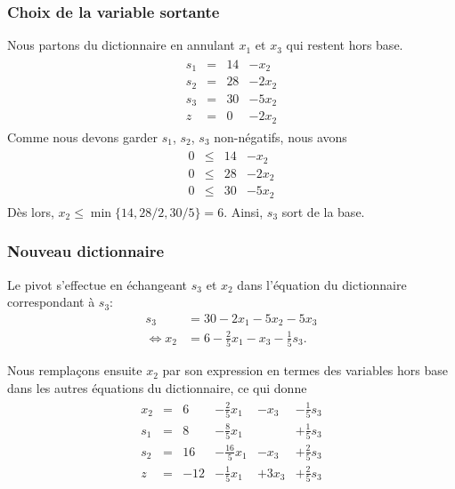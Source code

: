 \documentclass[usepdftitle=false]{beamer}
\begin{document}
\begin{frame}
\frametitle{Choix de la variable sortante}

Nous partons du dictionnaire en annulant $x_1$ et $x_3$ qui restent hors base.
\begin{align*}
\begin{array}{cccc}
s_1 & = & 14 & - x_2 \\
s_2 & =	& 28 & - 2x_2 \\
s_3 & =	& 30 & - 5x_2 \\
z & = & 0 & - 2 x_2
\end{array}
\end{align*}
Comme nous devons garder $s_1$, $s_2$, $s_3$ non-négatifs, nous avons
\begin{align*}
\begin{array}{cccc}
0 & \leq & 14 & - x_2 \\
0 & \leq & 28 & - 2x_2 \\
0 & \leq	& 30 & - 5x_2
\end{array}
\end{align*}
Dès lors, $x_2 \leq \min \{ 14, 28/2, 30/5 \} = 6$. Ainsi, $s_3$ sort de la base.

\end{frame}

\begin{frame}
\frametitle{Nouveau dictionnaire}

Le pivot s'effectue en échangeant $s_3$ et $x_2$ dans l'équation du dictionnaire correspondant à $s_3:$
\begin{align*}
s_3 & = 30 - 2x_1 - 5x_2 - 5x_3 \\
\Leftrightarrow x_2 & = 6 - \frac{2}{5}x_1 - x_3 - \frac{1}{5}s_3.
\end{align*}

Nous remplaçons ensuite $x_2$ par son expression en termes des variables hors base dans les autres équations du dictionnaire, ce qui donne
\begin{align*}
\begin{array}{cccccc}
x_2 & = & 6 & - \frac{2}{5}x_1 & - x_3 &- \frac{1}{5}s_3 \\
s_1 & = & 8 & - \frac{8}{5}x_1 &  & + \frac{1}{5}s_3 \\
s_2 & =	& 16 & - \frac{16}{5}x_1 & - x_3 & + \frac{2}{5}s_3 \\
z & = & -12 & - \frac{1}{5}x_1 & + 3 x_3 & + \frac{2}{5}s_3
\end{array}
\end{align*}

\end{frame}
\end{document}
